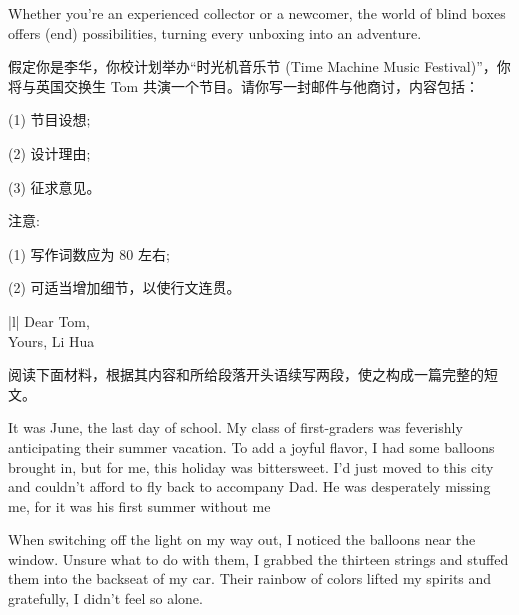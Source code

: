 \documentclass{英语试卷}
\begin{document}
\par Whether you're an experienced collector or a newcomer, the world of blind boxes offers  (end) possibilities, turning every unboxing into an adventure.\par
{}
\par 假定你是李华，你校计划举办“时光机音乐节 (Time Machine Music Festival)”，你将与英国交换生 Tom 共演一个节目。请你写一封邮件与他商讨，内容包括：\par
\par (1) 节目设想;\par
\par (2) 设计理由;\par
\par (3) 征求意见。\par
\par 注意:\par
\par (1) 写作词数应为 80 左右;\par
\par (2) 可适当增加细节，以使行文连贯。\par
\par\vspace{0.4em}
\begin{center}\begin{tabular}{{|l|}}
\hline
Dear Tom, \\
Yours, Li Hua \\
\hline
\end{tabular}\end{center}
\vspace{0.4em}
\par 阅读下面材料，根据其内容和所给段落开头语续写两段，使之构成一篇完整的短文。\par
\par It was June, the last day of school. My class of first-graders was feverishly anticipating their summer vacation. To add a joyful flavor, I had some balloons brought in, but for me, this holiday was bittersweet. I'd just moved to this city and couldn't afford to fly back to accompany Dad. He was desperately missing me, for it was his first summer without me\par
\par When switching off the light on my way out, I noticed the balloons near the window. Unsure what to do with them, I grabbed the thirteen strings and stuffed them into the backseat of my car. Their rainbow of colors lifted my spirits and gratefully, I didn't feel so alone.\par
\end{document}
